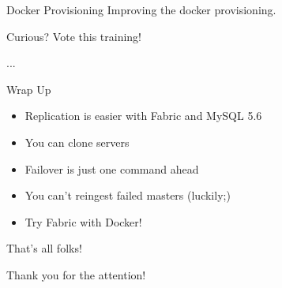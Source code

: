 \documentclass{beamer}[10]
\begin{document}
\begin{pyframe}{Docker Provisioning}
Improving the docker provisioning.

Curious? Vote this training!

\begin{bashcode}
...
\end{bashcode}
\end{pyframe}

\begin{pyframe}{Wrap Up}
\begin{itemize}
\item Replication is easier with Fabric and MySQL 5.6
\item You can clone servers
\item Failover is just one command ahead
\item You can't re\-ingest failed masters (luckily;)
\item Try Fabric with Docker!
\end{itemize}
\end{pyframe}


\begin{pyframe}{That's all folks!}
\begin{center}
Thank you for the attention! \\\\
\insertauthor
\end{center}
\end{pyframe}
\end{document}
